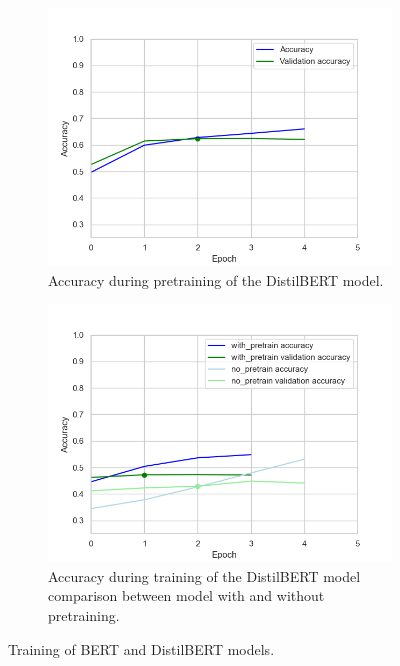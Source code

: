 \documentclass[acmsmall,nonacm]{acmart}
\begin{document}
\begin{figure}[h!]
\begin{subfigure}[b]{0.4\linewidth}
    \vspace{2ex}
  \end{subfigure} 
  \begin{subfigure}[b]{0.4\linewidth}
    \includegraphics[width=\textwidth]{assets/distilbert-base-cased_accuracy.png}
    \caption{Accuracy during pretraining of the DistilBERT model.}
    \label{fig:distilled_bert_model_pretrain}
  \end{subfigure}%
  \hfill
  \begin{subfigure}[b]{0.4\linewidth}
    \includegraphics[width=\textwidth]{assets/distilbert-base-cased_comparison_with_pretrain_no_pretrain.png}
    \caption{Accuracy during training of the DistilBERT model comparison between model with and without pretraining.}
    \label{fig:distilled_bert_model_train}
  \end{subfigure} 
  \caption{Training of BERT and DistilBERT models.}
  \label{fig:bert_distilbert_training} 
\end{figure}
\end{document}
